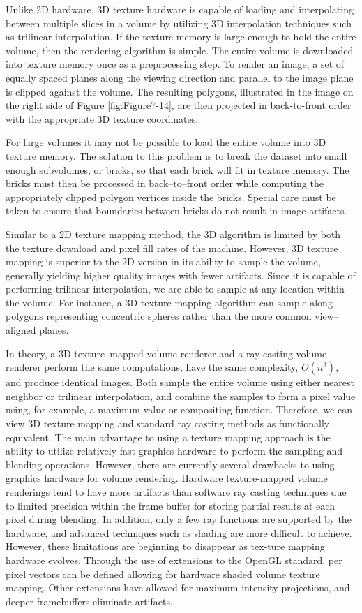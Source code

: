 Unlike 2D hardware, 3D texture hardware is capable of loading and interpolating between multiple slices in a volume by utilizing 3D interpolation techniques such as trilinear interpolation. If the texture memory is large enough to hold the entire volume, then the rendering algorithm is simple. The entire volume is downloaded into texture memory once as a preprocessing step. To render an image, a set of equally spaced planes along the viewing direction and parallel to the image plane is clipped against the volume. The resulting polygons, illustrated in the image on the right side of Figure \ref{fig:Figure7-14}, are then projected in back-to-front order with the appropriate 3D texture coordinates.

For large volumes it may not be possible to load the entire volume into 3D texture memory. The solution to this problem is to break the dataset into small enough subvolumes, or bricks, so that each brick will fit in texture memory. The bricks must then be processed in back--to--front order while computing the appropriately clipped polygon vertices inside the bricks. Special care must be taken to ensure that boundaries between bricks do not result in image artifacts.

Similar to a 2D texture mapping method, the 3D algorithm is limited by both the texture download and pixel fill rates of the machine. However, 3D texture mapping is superior to the 2D version in its ability to sample the volume, generally yielding higher quality images with fewer artifacts. Since it is capable of performing trilinear interpolation, we are able to sample at any location within the volume. For instance, a 3D texture mapping algorithm can sample along polygons representing concentric spheres rather than the more common view--aligned planes.

In theory, a 3D texture--mapped volume renderer and a ray casting volume renderer perform the same computations, have the same complexity, $O(n^3)$, and produce identical images. Both sample the entire volume using either nearest neighbor or trilinear interpolation, and combine the samples to form a pixel value using, for example, a maximum value or compositing function. Therefore, we can view 3D texture mapping and standard ray casting methods as functionally equivalent. The main advantage to using a texture mapping approach is the ability to utilize relatively fast graphics hardware to perform the sampling and blending operations. However, there are currently several drawbacks to using graphics hardware for volume rendering. Hardware texture-mapped volume renderings tend to have more artifacts than software ray casting techniques due to limited precision within the frame buffer for storing partial results at each pixel during blending. In addition, only a few ray functions are supported by the hardware, and advanced techniques such as shading are more difficult to achieve. However, these limitations are beginning to disappear as tex-ture mapping hardware evolves. Through the use of extensions to the OpenGL standard, per pixel vectors can be defined allowing for hardware shaded volume texture mapping. Other extensions have allowed for maximum intensity projections, and deeper framebuffers eliminate artifacts.

